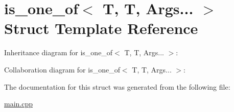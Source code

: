 \hypertarget{structis__one__of_3_01T_00_01T_00_01Args_8_8_8_01_4}{}\section{is\+\_\+one\+\_\+of$<$ T, T, Args... $>$ Struct Template Reference}
\label{structis__one__of_3_01T_00_01T_00_01Args_8_8_8_01_4}


Inheritance diagram for is\+\_\+one\+\_\+of$<$ T, T, Args... $>$\+:


Collaboration diagram for is\+\_\+one\+\_\+of$<$ T, T, Args... $>$\+:


The documentation for this struct was generated from the following file\+:\begin{DoxyCompactItemize}
\item 
\hyperlink{main_8cpp}{main.\+cpp}\end{DoxyCompactItemize}
